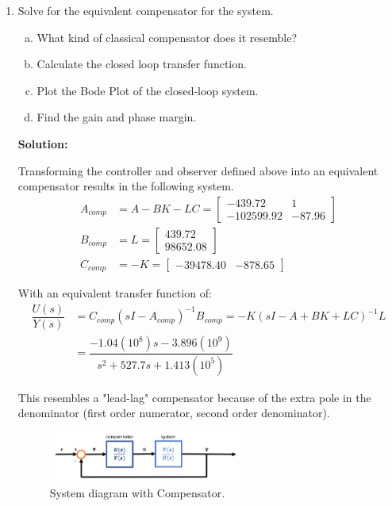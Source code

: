 \documentclass[11pt]{article}
\newcommand{\solution}{\textbf{Solution: \\}}
\begin{document}
\begin{enumerate}[label=\textbf{\arabic*.}]
  \vspace{24pt}
  \item Solve for the equivalent compensator for the system.
  \begin{enumerate}[(a)]
    \itemsep -6pt
    \item What kind of classical compensator does it resemble?
    \item Calculate the closed loop transfer function.
    \item Plot the Bode Plot of the closed-loop system.
    \item Find the gain and phase margin.
  \end{enumerate}
  \solution

  Transforming the controller and observer defined above into an equivalent 
  compensator results in the following system.
  \begin{equation}
    \begin{split}
      A_{comp} &= A - BK - LC =
      \begin{bmatrix}
        -439.72 & 1 \\ -102599.92 & -87.96
      \end{bmatrix} \\
      B_{comp} &= L =
      \begin{bmatrix}
        439.72 \\ 98652.08
      \end{bmatrix} \\
      C_{comp} &= -K =
      \begin{bmatrix}
        -39478.40 & -878.65
      \end{bmatrix}
    \end{split}
  \end{equation}

  With an equivalent transfer function of:
  \begin{equation}
    \begin{split}
      \dfrac{U(s)}{Y(s)} & = C_{comp}(sI-A_{comp})^{-1}B_{comp} 
      = -K(sI - A + BK + LC)^{-1}L \\
      &= \dfrac{-1.04(10^8)s - 3.896(10^9)}{s^2 + 527.7s + 1.413(10^5)}
    \end{split}
  \end{equation}

  This resembles a "lead-lag" compensator because of the extra pole in the 
  denominator (first order numerator, second order denominator).

  \begin{figure}[H]
    \centering
    \includegraphics[width=0.6\textwidth]{p4-1.png}
    \caption{System diagram with Compensator.}
  \end{figure}


\end{enumerate}
\end{document}

